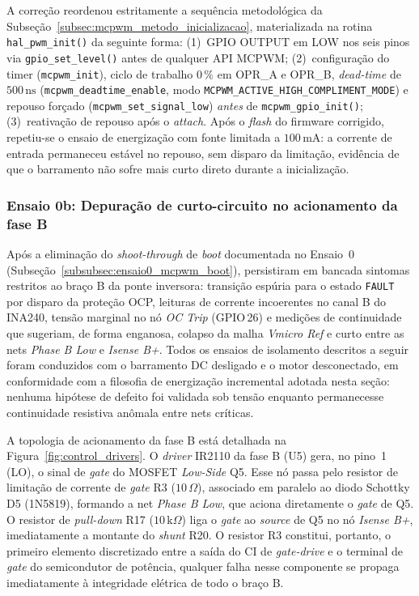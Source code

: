 A correção reordenou estritamente a sequência metodológica da Subseção~\ref{subsec:mcpwm_metodo_inicializacao}, materializada na rotina \texttt{hal\_pwm\_init()} da seguinte forma: (1)~GPIO OUTPUT em LOW nos seis pinos via \texttt{gpio\_set\_level()} antes de qualquer API MCPWM; (2)~configuração do timer (\texttt{mcpwm\_init}), ciclo de trabalho $0\,\%$ em OPR\_A e OPR\_B, \textit{dead-time} de $500\,\text{ns}$ (\texttt{mcpwm\_deadtime\_enable}, modo \texttt{MCPWM\_ACTIVE\_HIGH\_COMPLIMENT\_MODE}) e repouso forçado (\texttt{mcpwm\_set\_signal\_low}) \textit{antes} de \texttt{mcpwm\_gpio\_init()}; (3)~reativação de repouso após o \textit{attach}. Após o \textit{flash} do firmware corrigido, repetiu-se o ensaio de energização com fonte limitada a $100\,\text{mA}$: a corrente de entrada permaneceu estável no repouso, sem disparo da limitação, evidência de que o barramento não sofre mais curto direto durante a inicialização.

\subsubsection{Ensaio 0b: Depuração de curto-circuito no acionamento da fase B}
\label{subsubsec:ensaio0b_curto_fase_b}

Após a eliminação do \textit{shoot-through} de \textit{boot} documentada no Ensaio~0 (Subseção~\ref{subsubsec:ensaio0_mcpwm_boot}), persistiram em bancada sintomas restritos ao braço B da ponte inversora: transição espúria para o estado \texttt{FAULT} por disparo da proteção OCP, leituras de corrente incoerentes no canal B do INA240, tensão marginal no nó \textit{OC Trip} (GPIO\,26) e medições de continuidade que sugeriam, de forma enganosa, colapso da malha \textit{Vmicro Ref} e curto entre as nets \textit{Phase B Low} e \textit{Isense B+}. Todos os ensaios de isolamento descritos a seguir foram conduzidos com o barramento DC desligado e o motor desconectado, em conformidade com a filosofia de energização incremental adotada nesta seção: nenhuma hipótese de defeito foi validada sob tensão enquanto permanecesse continuidade resistiva anômala entre nets críticas.

A topologia de acionamento da fase B está detalhada na Figura~\ref{fig:control_drivers}. O \textit{driver} IR2110 da fase B (U5) gera, no pino~1 (LO), o sinal de \textit{gate} do MOSFET \textit{Low-Side} Q5. Esse nó passa pelo resistor de limitação de corrente de \textit{gate} R3 ($10\,\Omega$), associado em paralelo ao diodo Schottky D5 (1N5819), formando a net \textit{Phase B Low}, que aciona diretamente o \textit{gate} de Q5. O resistor de \textit{pull-down} R17 ($10\,\text{k}\Omega$) liga o \textit{gate} ao \textit{source} de Q5 no nó \textit{Isense B+}, imediatamente a montante do \textit{shunt} R20. O resistor R3 constitui, portanto, o primeiro elemento discretizado entre a saída do CI de \textit{gate-drive} e o terminal de \textit{gate} do semicondutor de potência, qualquer falha nesse componente se propaga imediatamente à integridade elétrica de todo o braço B.

